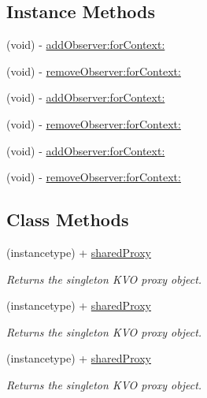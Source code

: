 \subsection*{Instance Methods}
\begin{DoxyCompactItemize}
\item 
(void) -\/ \mbox{\hyperlink{interface_r_a_c_k_v_o_proxy_a0ec4ef4f07c0068901c7d606de89a1fd}{add\+Observer\+:for\+Context\+:}}
\item 
(void) -\/ \mbox{\hyperlink{interface_r_a_c_k_v_o_proxy_a1b7a8cc1af60353400c05976d9078d73}{remove\+Observer\+:for\+Context\+:}}
\item 
(void) -\/ \mbox{\hyperlink{interface_r_a_c_k_v_o_proxy_a0ec4ef4f07c0068901c7d606de89a1fd}{add\+Observer\+:for\+Context\+:}}
\item 
(void) -\/ \mbox{\hyperlink{interface_r_a_c_k_v_o_proxy_a1b7a8cc1af60353400c05976d9078d73}{remove\+Observer\+:for\+Context\+:}}
\item 
(void) -\/ \mbox{\hyperlink{interface_r_a_c_k_v_o_proxy_a0ec4ef4f07c0068901c7d606de89a1fd}{add\+Observer\+:for\+Context\+:}}
\item 
(void) -\/ \mbox{\hyperlink{interface_r_a_c_k_v_o_proxy_a1b7a8cc1af60353400c05976d9078d73}{remove\+Observer\+:for\+Context\+:}}
\end{DoxyCompactItemize}
\subsection*{Class Methods}
\begin{DoxyCompactItemize}
\item 
\mbox{\label{interface_r_a_c_k_v_o_proxy_a44fc0745be832a507feada809c9d299b}} 
(instancetype) + \mbox{\hyperlink{interface_r_a_c_k_v_o_proxy_a44fc0745be832a507feada809c9d299b}{shared\+Proxy}}
\begin{DoxyCompactList}\small\item\em Returns the singleton K\+VO proxy object. \end{DoxyCompactList}\item 
\mbox{\label{interface_r_a_c_k_v_o_proxy_a44fc0745be832a507feada809c9d299b}} 
(instancetype) + \mbox{\hyperlink{interface_r_a_c_k_v_o_proxy_a44fc0745be832a507feada809c9d299b}{shared\+Proxy}}
\begin{DoxyCompactList}\small\item\em Returns the singleton K\+VO proxy object. \end{DoxyCompactList}\item 
\mbox{\label{interface_r_a_c_k_v_o_proxy_a44fc0745be832a507feada809c9d299b}} 
(instancetype) + \mbox{\hyperlink{interface_r_a_c_k_v_o_proxy_a44fc0745be832a507feada809c9d299b}{shared\+Proxy}}
\begin{DoxyCompactList}\small\item\em Returns the singleton K\+VO proxy object. \end{DoxyCompactList}\end{DoxyCompactItemize}


